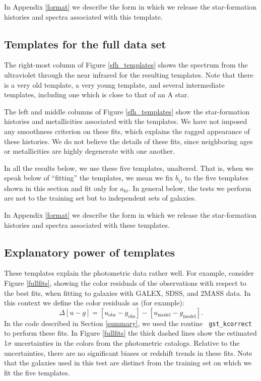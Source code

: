 \documentclass[10pt,preprint]{aastex}
\begin{document}
In Appendix \ref{format} we describe the form in which we release 
the star-formation histories and spectra associated with this
template.

\subsection{Templates for the full data set}

The right-most column of Figure \ref{sfh_templates} shows the spectrum
from the ultraviolet through the near infrared for the resulting
templates. Note that there is a very old template, a very young
template, and several intermediate templates, including one which is
close to that of an A star.

The left and middle columns of Figure \ref{sfh_templates} show the
star-formation histories and metallicities associated with the
templates. We have not imposed any smoothness criterion on these fits,
which explains the ragged appearance of these histories. We do not
believe the details of these fits, since neighboring ages or
metallicities are highly degenerate with one another.

In all the results below, we use these five templates, unaltered. That
is, when we speak below of ``fitting'' the templates, we mean we fix
$b_{ij}$ to the five templates shown in this section and fit only for
$a_{ki}$. In general below, the tests we perform are not to the
training set but to independent sets of galaxies.

In Appendix \ref{format} we describe the form in which we release the
star-formation histories and spectra associated with these templates.

\subsection{Explanatory power of templates}

These templates explain the photometric data rather well. For example,
consider Figure \ref{fullfits}, showing the color residuals of the
observations with respect to the best fits, when fitting to galaxies
with GALEX, SDSS, and 2MASS data. In this context we define the color
residuals as (for example):
\begin{equation}
\Delta [u-g] = [u_{\mathrm{obs}}- g_{\mathrm{obs}}] -
[u_{\mathrm{model}}- g_{\mathrm{model}}] .
\end{equation}
In the code described in Section \ref{summary}, we used the routine {\tt
gst\_kcorrect} to perform these fits.  In Figure \ref{fullfits} the
thick dashed lines show the estimated 1$\sigma$ uncertainties in the
colors from the photometric catalogs. Relative to the uncertainties,
there are no significant biases or redshift trends in these fits. Note
that the galaxies used in this test are distinct from the training set
on which we fit the five templates.
\end{document}
